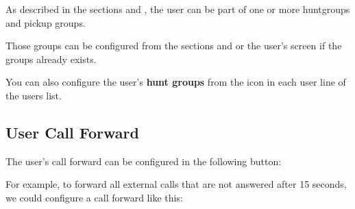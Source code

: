 \documentclass[letterpaper,10pt,english]{sphinxmanual}
\begin{document}
As described in the sections {\hyperref[pbx_features/huntgroups:huntgroups]{}} and {\hyperref[pbx_features/call_captures:capture\string-groups]{}}, the
user can be part of one or more huntgroups and pickup groups.

Those groups can be configured from the sections {\hyperref[pbx_features/huntgroups:huntgroups]{}} and
{\hyperref[pbx_features/call_captures:capture\string-groups]{}} or the user's screen if the groups already exists.

You can also configure the user's \textbf{hunt groups} from the icon in each user
line of the users list.



\subsection{User Call Forward}
\label{pbx_features/users:user-call-forward}
The user's call forward can be configured in the following button:

\label{pbx_features/users:fwd-to-vm}
For example, to forward all external calls that are not answered after 15
seconds, we could configure a call forward like this:

\end{document}
